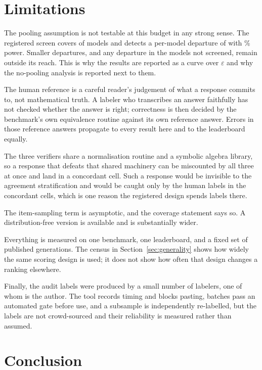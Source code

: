 
\section{Limitations}
\label{sec:limitations}

The pooling assumption is not testable at this budget in any strong sense. The registered
screen covers \ScreenedModels{} of \NumModels{} models and detects a per-model departure of
\ScreenRho{} with \ScreenPowerPct\% power. Smaller departures, and any departure in the models not
screened, remain outside its reach. This is why the results are reported as a curve over
$\varepsilon$ and why the no-pooling analysis is reported next to them.

The human reference is a careful reader's judgement of what a response commits to, not
mathematical truth. A labeler who transcribes an answer faithfully has not checked whether the
answer is right; correctness is then decided by the benchmark's own equivalence routine
against its own reference answer. Errors in those reference answers propagate to every result
here and to the leaderboard equally.

The three verifiers share a normalisation routine and a symbolic algebra library, so a
response that defeats that shared machinery can be miscounted by all three at once and land in
a concordant cell. Such a response would be invisible to the agreement stratification and
would be caught only by the human labels in the concordant cells, which is one reason the
registered design spends labels there.

The item-sampling term is asymptotic, and the coverage statement says so. A
distribution-free version is available and is substantially wider.

Everything is measured on one benchmark, one leaderboard, and a fixed set of published
generations. The census in Section~\ref{sec:generality} shows how widely the same scoring
design is used; it does not show how often that design changes a ranking elsewhere.

Finally, the audit labels were produced by a small number of labelers, one of whom is the
author. The tool records timing and blocks pasting, batches pass an automated gate before use,
and a subsample is independently re-labelled, but the labels are not crowd-sourced and their
reliability is measured rather than assumed.

\section{Conclusion}
\label{sec:conclusion}

